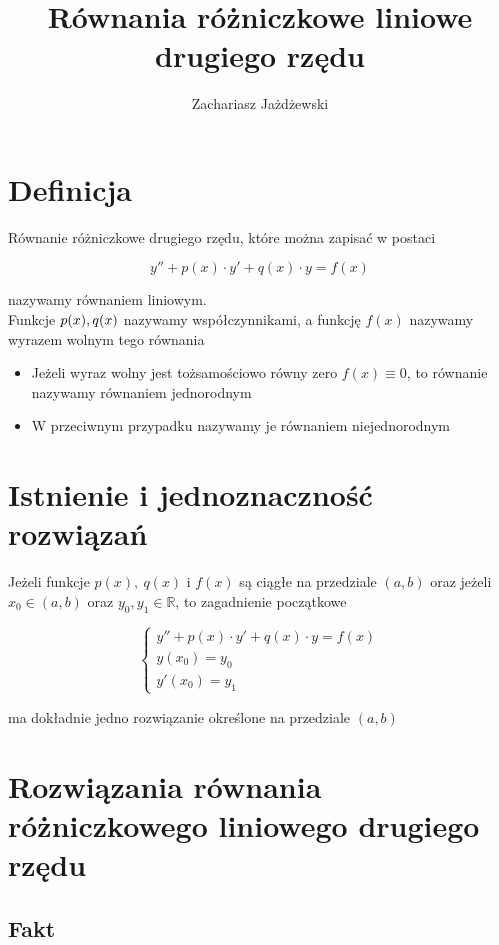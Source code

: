 \documentclass[a4paper,12pt]{article}
\title{Równania różniczkowe liniowe drugiego rzędu}
\author{Zachariasz Jażdżewski}
\begin{document}
\maketitle

\section{Definicja}
Równanie różniczkowe drugiego rzędu, które można zapisać w postaci

\[ y'' + p(x) \cdot y' + q(x) \cdot y = f(x) \]

nazywamy równaniem liniowym. \\

Funkcje $p(x), \space q(x)$ nazywamy współczynnikami, a funkcję $f(x)$ nazywamy 
wyrazem wolnym tego równania 

\begin{itemize}
    \item Jeżeli wyraz wolny jest tożsamościowo równy zero $f(x) \equiv 0$, to równanie nazywamy równaniem jednorodnym
    \item W przeciwnym przypadku nazywamy je równaniem niejednorodnym
\end{itemize}

\section{Istnienie i jednoznaczność rozwiązań}

Jeżeli funkcje $p(x), \ q(x)$ i $f(x)$ są ciągłe na przedziale $(a,b)$ oraz jeżeli $x_0 \in (a,b)$ oraz $y_0,  y_1 \in \mathbb{R}$, to zagadnienie początkowe

$$
\begin{cases}
   y'' + p(x) \cdot y' + q(x) \cdot y = f(x) \\
   y(x_0) = y_0 \\
   y'(x_0) = y_1
\end{cases}
$$

ma dokładnie jedno rozwiązanie określone na przedziale $(a,b)$

\section{Rozwiązania równania różniczkowego liniowego drugiego rzędu}

\subsection{Fakt}
\end{document}
